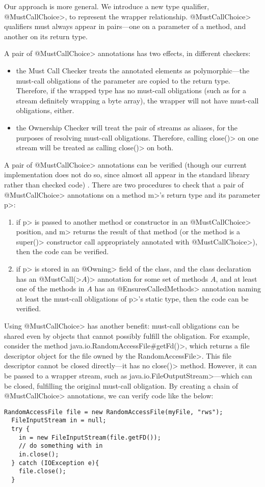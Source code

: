 Our approach is more general. We introduce a new type qualifier,
\<@MustCallChoice>, to represent the wrapper relationship. \<@MustCallChoice>
qualifiers must always appear in pairs---one on a parameter of a method,
and another on its return type.

A pair of \<@MustCallChoice> annotations has two effects, in different
checkers:
\begin{itemize}
\item the Must Call Checker treats the annotated elements as polymorphic---the
  must-call obligations of the parameter are copied to the return type.
  Therefore, if the wrapped type has no must-call obligations (such as
  for a stream definitely wrapping a byte array), the wrapper will not
  have must-call obligations, either.
\item the Ownership Checker will treat the pair of streams as aliases,
  for the purposes of resolving must-call obligations. Therefore, calling
  \<close()> on one stream will be treated as calling \<close()> on both.
\end{itemize}

A pair of \<@MustCallChoice> annotations can be verified (though our current
implementation does not do so, since almost all appear in the standard
library rather than checked code) . There are two
procedures to check
that a pair of \<@MustCallChoice> annotations on a method \<m>'s return type
and its parameter \<p>:
\begin{enumerate}
\item if \<p> is passed to another method or constructor in an
  \<@MustCallChoice> position, and \<m> returns the result of that method
  (or the method is a \<super()> constructor call appropriately annotated
  with \<@MustCallChoice>), then the code can be verified.
\item if \<p> is stored in an \<@Owning> field of the class, and the
  class declaration has an \<@MustCall(>$A$\<)> annotation for some set
  of methods $A$, and at least one of the methods in $A$ has an
  \<@EnsuresCalledMethods> annotation naming at least the
  must-call obligations of \<p>'s static type, then the code can be verified.
\end{enumerate}

Using \<@MustCallChoice> has another benefit: must-call obligations
can be shared even by objects that cannot possibly fulfill the
obligation. For example, consider the method
\<java.io.RandomAccessFile\#getFd()>, which returns a file descriptor
object for the file owned by the \<RandomAccessFile>. This file
descriptor cannot be closed directly---it has no \<close()> method.
However, it can be passed to a wrapper stream, such as
\<java.io.FileOutputStream>---which can be closed, fulfilling
the original must-call obligation. By creating a chain of \<@MustCallChoice>
annotations, we can verify code like the below:

\begin{lstlisting}[frame=tb,belowskip=3mm]
  RandomAccessFile file = new RandomAccessFile(myFile, "rws");
  FileInputStream in = null;
  try {
    in = new FileInputStream(file.getFD());
    // do something with in  
    in.close();
  } catch (IOException e){
    file.close();
  }
\end{lstlisting}

